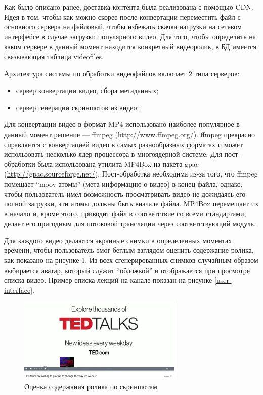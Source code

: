 Как было описано ранее, доставка контента была реализована с помощью CDN.
Идея в том, чтобы как можно скорее после конвертации переместить файл с основного сервера на файловый,
чтобы избежать скачка нагрузки на сетевом интерфейсе в случае загрузки популярного видео.
Для того, чтобы определить на каком сервере в данный момент находится конкретный видеоролик,
в БД имеется связывающая таблица videofiles.

Архитектура системы по обработки видеофайлов включает 2 типа серверов:

\begin{itemize}[wide,topsep=0pt]
  \itemsep0em
  \item сервер конвертации видео, сбора метаданных;
  \item сервер генерации скриншотов из видео;
\end{itemize}

Для конвертации видео в формат MP4 использовано наиболее популярное в данный момент решение — ffmpeg (\url{http://www.ffmpeg.org/}).
ffmpeg прекрасно справляется с конвертацией видео в самых разнообразных форматах и может использовать несколько ядер
процессора в многоядерной системе. Для пост-обработки была использована утилита MP4Box из пакета gpac (\url{http://gpac.sourceforge.net/}).
Пост-обработка необходима из-за того, что ffmpeg помещает “moov-атомы” (мета-информацию о видео) в конец файла, однако,
чтобы пользователь имел возможность просматривать видео не дожидаясь его полной загрузки, эти атомы должны быть
вначале файла. MP4Box перемещает их в начало и, кроме этого, приводит файл в соответствие со всеми стандартами,
делает его пригодным для потоковой трансляции через соответствующий модуль.

Для каждого видео делаются экранные снимки в определенных моментах времени, чтобы пользователь смог беглым взглядом
оценить содержание ролика, как показано на рисунке \ref{thumbnails}. Из всех сгенерированных снимков
случайным образом выбирается аватар, который служит “обложкой” и отображается при просмотре списка видео. Пример списка
лекций на канале показан на рисунке \ref{user-interface}.

\begin{figure}
  \centering
  \includegraphics[width=0.7\textwidth]{images/thumbnails.jpg}
  \caption{Оценка содержания ролика по скриншотам}\label{thumbnails}
\end{figure}

